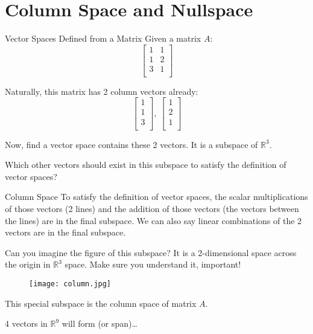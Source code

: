 \documentclass{beamer}
\begin{document}
\section{Column Space and Nullspace}
\begin{frame}{Vector Spaces Defined from a Matrix}
Given a matrix $A$:
\begin{equation*}
    \left[ \begin{matrix}
        1&		1\\
        1&		2\\
        3&		1\\
    \end{matrix} \right]
\end{equation*}

Naturally, this matrix has 2 column vectors already:
\begin{equation*}
    \left[ \begin{array}{c}
        1\\
        1\\
        3\\
    \end{array} \right] ,\: \left[ \begin{array}{c}
        1\\
        2\\
        1\\
    \end{array} \right]
\end{equation*}

Now, find a vector space contains these 2 vectors. It is a subspace of $\mathbb{R} ^3$.

\vspace{3pt}
Which other vectors should exist in this subspace to satisfy the definition of vector spaces?

\vspace{3pt}

\end{frame}

\begin{frame}{Column Space}
To satisfy the definition of vector spaces, the scalar multiplications of those vectors (2 lines) and the addition of those vectors (the vectors between the lines) are in the final subspace. We can also say \alert{linear combinations} of the 2 vectors are in the final subspace.

\vspace{3pt}
Can you imagine the figure of this subspace? It is a 2-dimensional space across the origin in $\mathbb{R} ^3$ space. Make sure you understand it, important!
\begin{figure}
    \centering
    \texttt{[image: column.jpg]}
\end{figure}
\vspace{-14pt}
This special subspace is the column space of matrix $A$.

\vspace{3pt}
4 vectors in $\mathbb{R} ^9$ will form (or \alert{span})\dots
\end{frame}
\end{document}
